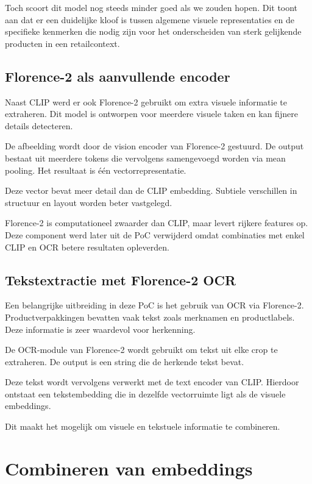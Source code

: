 Toch scoort dit model nog steeds minder goed als we zouden hopen. Dit toont aan dat er een duidelijke kloof is tussen algemene visuele representaties en de specifieke kenmerken die nodig zijn voor het onderscheiden van sterk gelijkende producten in een retailcontext.

\subsection{Florence-2 als aanvullende encoder}

Naast CLIP werd er ook Florence-2 gebruikt om extra visuele informatie te extraheren. Dit model is ontworpen voor meerdere visuele taken en kan fijnere details detecteren.

De afbeelding wordt door de vision encoder van Florence-2 gestuurd. De output bestaat uit meerdere tokens die vervolgens samengevoegd worden via mean pooling. Het resultaat is één vectorrepresentatie.

Deze vector bevat meer detail dan de CLIP embedding. Subtiele verschillen in structuur en layout worden beter vastgelegd.

Florence-2 is computationeel zwaarder dan CLIP, maar levert rijkere features op. Deze component werd later uit de PoC verwijderd omdat combinaties met enkel CLIP en OCR betere resultaten opleverden.

\subsection{Tekstextractie met Florence-2 OCR}

Een belangrijke uitbreiding in deze PoC is het gebruik van OCR via Florence-2. Productverpakkingen bevatten vaak tekst zoals merknamen en productlabels. Deze informatie is zeer waardevol voor herkenning.

De OCR-module van Florence-2 wordt gebruikt om tekst uit elke crop te extraheren. De output is een string die de herkende tekst bevat.

Deze tekst wordt vervolgens verwerkt met de text encoder van CLIP. Hierdoor ontstaat een tekstembedding die in dezelfde vectorruimte ligt als de visuele embeddings.

Dit maakt het mogelijk om visuele en tekstuele informatie te combineren.

\section{Combineren van embeddings}


